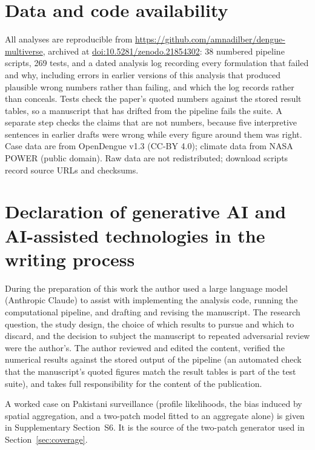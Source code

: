 \documentclass[11pt,a4paper]{article}
\begin{document}
\section*{Data and code availability}

All analyses are reproducible from \url{https://github.com/amnadilber/dengue-multiverse}, archived at \href{https://doi.org/10.5281/zenodo.21854302}{doi:10.5281/zenodo.21854302}: 38 numbered pipeline
scripts, 269 tests, and a dated analysis log recording every formulation that
failed and why, including errors in earlier versions of this analysis that
produced plausible wrong numbers rather than failing, and which the log records
rather than conceals. Tests check the paper's quoted numbers against the stored
result tables, so a manuscript that has drifted from the pipeline fails the
suite. A separate step checks the claims that are not numbers, because five
interpretive sentences in earlier drafts were wrong while every figure around
them was right. Case data are from OpenDengue v1.3 (CC-BY 4.0); climate data from
NASA POWER (public domain). Raw data are not redistributed; download scripts
record source URLs and checksums.


\section*{Declaration of generative AI and AI-assisted technologies in the
writing process}

During the preparation of this work the author used a large language model
(Anthropic Claude) to assist with implementing the analysis code, running the
computational pipeline, and drafting and revising the manuscript. The research
question, the study design, the choice of which results to pursue and which to
discard, and the decision to subject the manuscript to repeated adversarial
review were the author's. The author reviewed and edited the content, verified
the numerical results against the stored output of the pipeline (an
automated check that the manuscript's quoted figures match the result tables is
part of the test suite), and takes full responsibility for the content of the
publication.

A worked case on Pakistani surveillance (profile likelihoods, the bias
induced by spatial aggregation, and a two-patch model fitted to an aggregate
alone) is given in Supplementary Section~S6. It is the source of the
two-patch generator used in Section~\ref{sec:coverage}.
\end{document}
